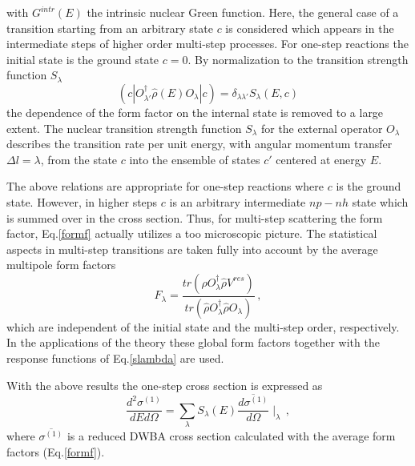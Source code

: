 \documentclass[twocolumn,amsmath,amssymb,10pt,groupedaddress,a4paper]{revtex4}
\begin{document}
\noindent with $G^{intr}(E)$ the intrinsic nuclear Green function.
Here, the general case of a transition starting from an arbitrary
state $c$ is considered which appears in the intermediate steps of
higher order multi-step processes. For one-step reactions the initial
state is the ground state $c=0$. By normalization to the transition
strength function $S_{\lambda}$
\begin{equation}
(c|O_{\lambda'}^{\dag}\hat{\rho}(E)O_{\lambda}|c)=\delta_{\lambda\lambda'}S_{\lambda}(E,c)\label{slambda}
\end{equation}
\noindent the dependence of the form factor on the internal state is removed
to a large extent.
The nuclear transition strength function $S_{\lambda}$ for the external operator
$O_{\lambda}$ describes the transition rate per unit energy, with angular momentum transfer
$\Delta l=\lambda$, from the state
$c$ into the ensemble of states $c'$ centered at energy $E$.

The above relations are appropriate for one-step reactions where $c$
is the ground state. However, in higher steps $c$ is an arbitrary
intermediate $np-nh$ state which is summed over in the cross section.
Thus, for multi-step scattering the form factor, Eq.\ref{formf} actually
utilizes a too microscopic picture. The statistical aspects in multi-step
transitions are taken fully into account by the average multipole
form factors
\begin{equation}
F_{\lambda}=\frac{tr(\hat{\rho}O_{\lambda}^{\dag}\hat{\rho}V^{res})}{tr(\hat{\rho}O_{\lambda}^{\dag}\hat{\rho}O_{\lambda})}\,,\label{fav}
\end{equation}
\noindent which are independent of the initial state and the multi-step order,
respectively. In the applications of the theory these global form
factors together with the response functions of Eq.\ref{slambda}
are used.

With the above results the one-step cross section is expressed as
\begin{equation}
\frac{d^{2}\sigma^{(1)}}{dEd\Omega}=\sum_{\lambda}{S_{\lambda}(E)\overline{\frac{d\sigma^{(1)}}{d\Omega}}\mid_{\lambda}}\,,\label{sigma1}
\end{equation}
\noindent where $\overline{\sigma^{(1)}}$ is a reduced DWBA cross
section calculated with the average form factors (Eq.\ref{formf}).
\end{document}
